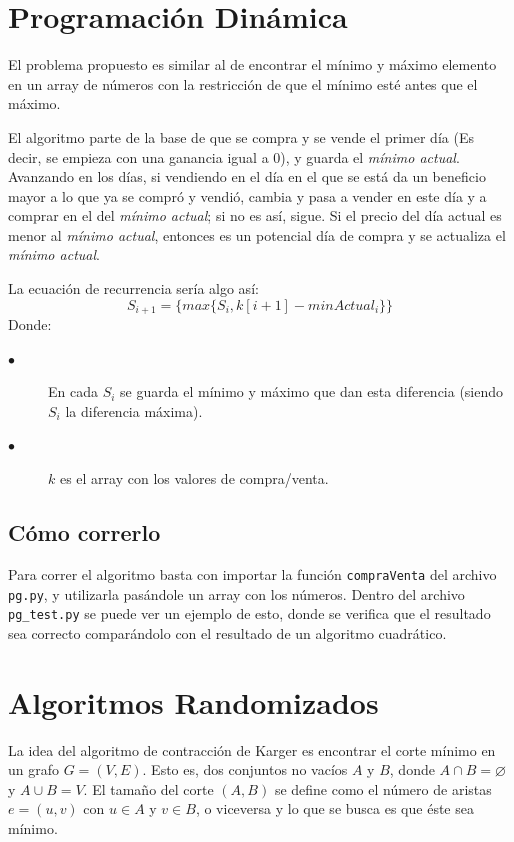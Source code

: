 \documentclass[a4paper,10pt]{article}
\begin{document}
\maketitle
\thispagestyle{empty}

\pagebreak 

\tableofcontents
\pagebreak

\clearpage
\section{Programación Dinámica}
El problema propuesto es similar al de encontrar el mínimo y máximo elemento en un array de números con la restricción de que el mínimo esté antes que el máximo.

El algoritmo parte de la base de que se compra y se vende el primer día (Es decir, se empieza con una ganancia igual a 0), y guarda el \textit{mínimo actual}. Avanzando en los días, si vendiendo en el día en el que se está da un beneficio mayor a lo que ya se compró y vendió, cambia y pasa a vender en este día y a comprar en el del \textit{mínimo actual}; si no es así, sigue. Si el precio del día actual es menor al \textit{mínimo actual}, entonces es un potencial día de compra y se actualiza el \textit{mínimo actual}.
 
La ecuación de recurrencia sería algo así:
\begin{equation}
	\label{eq:pg}
	S_{i+1}=\{max\{S_i,k[i+1] - minActual_i\}\}
	\tag{1.1}
\end{equation}
Donde:
\begin{description}
  \item[$\bullet$] En cada $S_i$ se guarda el mínimo y máximo que dan esta diferencia (siendo $S_i$ la diferencia máxima).
  \item[$\bullet$] $k$ es el array con los valores de compra/venta.
\end{description}

\subsection{Cómo correrlo}
Para correr el algoritmo basta con importar la función \texttt{compraVenta} del archivo \texttt{pg.py}, y utilizarla pasándole un array con los números. Dentro del archivo \texttt{pg\_test.py} se puede ver un ejemplo de esto, donde se verifica que el resultado sea correcto comparándolo con el resultado de un algoritmo cuadrático.

\section{Algoritmos Randomizados}
La idea del algoritmo de contracción de Karger es encontrar el corte mínimo en un grafo $G=(V,E)$. Esto es, dos conjuntos no vacíos $A$ y $B$, donde $A \cap B = \varnothing$ y $A \cup B = V$. El tamaño del corte $(A,B)$ se define como el número de aristas $e = (u,v)$ con $u \in A$ y $v \in B$, o viceversa y lo que se busca es que éste sea mínimo.
\end{document}
